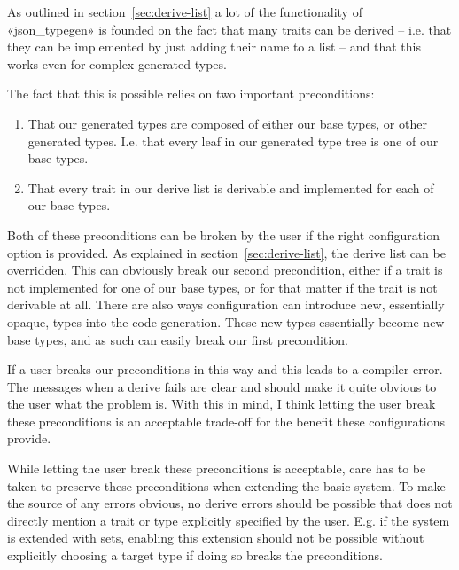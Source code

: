 As outlined in section~\ref{sec:derive-list} a lot of the functionality of «json_typegen» is founded on the fact that many traits can be derived -- i.e. that they can be implemented by just adding their name to a list -- and that this works even for complex generated types.

The fact that this is possible relies on two important preconditions:

\begin{enumerate}
  \item That our generated types are composed of either our base types, or other generated types. I.e. that every leaf in our generated type tree is one of our base types.
  \item That every trait in our derive list is derivable and implemented for each of our base types.
\end{enumerate}



Both of these preconditions can be broken by the user if the right configuration option is provided. As explained in section~\ref{sec:derive-list}, the derive list can be overridden. This can obviously break our second precondition, either if a trait is not implemented for one of our base types, or for that matter if the trait is not derivable at all. There are also ways configuration can introduce new, essentially opaque, types into the code generation. These new types essentially become new base types, and as such can easily break our first precondition.

If a user breaks our preconditions in this way and this leads to a compiler error. The messages when a derive fails are clear and should make it quite obvious to the user what the problem is. With this in mind, I think letting the user break these preconditions is an acceptable trade-off for the benefit these configurations provide.

While letting the user break these preconditions is acceptable, care has to be taken to preserve these preconditions when extending the basic system. To make the source of any errors obvious, no derive errors should be possible that does not directly mention a trait or type explicitly specified by the user. E.g. if the system is extended with sets, enabling this extension should not be possible without explicitly choosing a target type if doing so breaks the preconditions.


